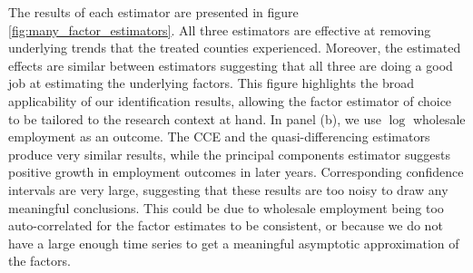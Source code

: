 \documentclass[12pt]{article}
\begin{document}
The results of each estimator are presented in figure \ref{fig:many_factor_estimators}. All three estimators are effective at removing underlying trends that the treated counties experienced. Moreover, the estimated effects are similar between estimators suggesting that all three are doing a good job at estimating the underlying factors. This figure highlights the broad applicability of our identification results, allowing the factor estimator of choice to be tailored to the research context at hand. In panel (b), we use $\log$ wholesale employment as an outcome. The CCE and the quasi-differencing estimators produce very similar results, while the principal components estimator suggests positive growth in employment outcomes in later years. Corresponding confidence intervals are very large, suggesting that these results are too noisy to draw any meaningful conclusions. This could be due to wholesale employment being too auto-correlated for the factor estimates to be consistent, or because we do not have a large enough time series to get a meaningful asymptotic approximation of the factors.
\end{document}
